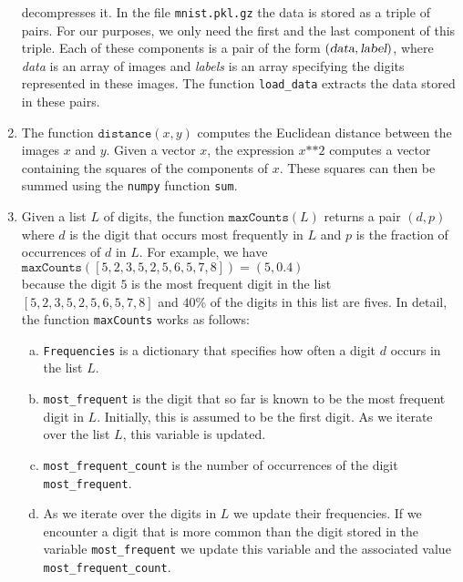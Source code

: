 \begin{enumerate}
      decompresses it.  In the file \texttt{mnist.pkl.gz} the data is stored as a triple of pairs.
      For our purposes, we only need the first and the last component of this triple.  Each of these components
      is a pair of the form $(\textsl{data}, \textsl{label})$, where \textsl{data} is an array of images and
      \textsl{labels} is an array specifying the digits represented in these images.
      The function \texttt{load\_data} extracts the data stored in these pairs.
\item The function $\mathtt{distance}(x, y)$ computes the Euclidean distance between the images $x$ and $y$.
      Given a vector $x$, the expression $x \texttt{**} 2$ computes a vector containing the squares of the
      components of $x$.  These squares can then be summed using the \texttt{numpy} function \texttt{sum}.
\item Given a list $L$ of digits, the function $\texttt{maxCounts}(L)$ returns a pair $(d, p)$ where $d$ is the digit that occurs most frequently in $L$
      and $p$ is the fraction of occurrences of $d$ in $L$.  For example, we have
      \\[0.2cm]
      \hspace*{1.3cm}
      $\texttt{maxCounts}([5,2,3,5,2,5,6,5,7,8]) = (5, 0.4)$
      \\[0.2cm]
      because the digit $5$ is the most frequent digit in the list $[5,2,3,5,2,5,6,5,7,8]$ and $40$\%
      of the digits in this list are fives.  In detail, the function \texttt{maxCounts} works as follows:
      \begin{enumerate}[(a)]
      \item \texttt{Frequencies} is a dictionary that specifies how often a digit $d$ occurs in the list $L$.
      \item \texttt{most\_frequent} is the digit that so far is known to be the most frequent digit in $L$.
            Initially, this is assumed to be the first digit.  As we iterate over the list $L$, this variable
            is updated.
      \item \texttt{most\_frequent\_count} is the number of occurrences of the digit \texttt{most\_frequent}.
      \item As we iterate over the digits in $L$ we update their frequencies.  If we encounter a digit that is
            more common than the digit stored in the variable \texttt{most\_frequent} we update this variable
            and the associated value \texttt{most\_frequent\_count}.
      \end{enumerate}

\end{enumerate}
